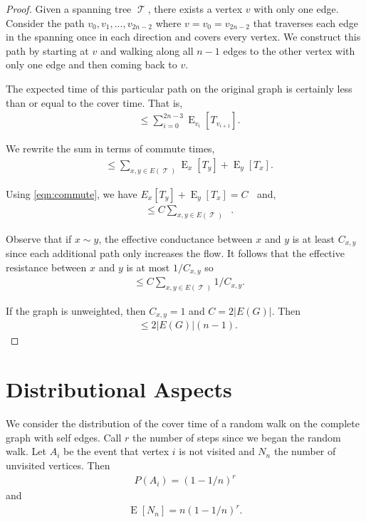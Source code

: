 \documentclass[12pt]{article}
\theoremstyle{definition}
\DeclareMathOperator{\E}{\mathrm{E}}		     %
\DeclareMathOperator{\tcov}{t_\textrm{cov}}      %
\DeclareMathOperator{\Rxy}{R_{\textrm{x,y}}}     %
\DeclareMathOperator{\T}{\mathcal{T}}            %
\begin{document}
\begin{proof}
Given a spanning tree $\T$, there exists a vertex $v$ with only one edge.
Consider the path $v_0, v_1, ..., v_{2n-2}$ where $v=v_0=v_{2n-2}$
that traverses each edge in the spanning once in each direction
and covers every vertex.
We construct this path by starting at $v$ and walking along all $n-1$ edges to the
other vertex with only one edge and then coming back to $v$.

The expected time of this particular path on the original graph is certainly less than
or equal to the cover time. That is,
\begin{align}
\tcov &\leq \sum_{i=0}^{2n-3} \E_{v_i}[T_{v_{i+1}}]. \nonumber
\end{align}

We rewrite the sum in terms of commute times,
\begin{align}
\tcov &\leq \sum_{x,y \in E(\T)} \E_x[T_y] + \E_y[T_x]. \nonumber
\end{align}

Using \cref{eqn:commute}, we have $E_x[T_y] + \E_y[T_x] = C \Rxy$ and,
\begin{align}
\tcov &\leq C \sum_{x,y \in E(\T)} \Rxy. \nonumber
\end{align}

Observe that if $x \sim y$,
the effective conductance between $x$ and $y$ is at least $C_{x,y}$
since each additional path only increases the flow.
It follows that the effective resistance between $x$ and $y$ is at most $1 / C_{x,y}$ so
\begin{align}
\tcov &\leq C \sum_{x,y \in E(\T)} 1 / C_{x,y}. \nonumber
\end{align}

If the graph is unweighted, then $C_{x,y} = 1$ and $C = 2 |E(G)|$.
Then
\begin{align}
\tcov \leq 2 |E(G)| (n-1). \nonumber
\end{align}

\end{proof}


\section{Distributional Aspects}
\cite{Du11}
We consider the distribution of the cover time of a random walk
on the complete graph with self edges.
Call $r$ the number of steps since we began the random walk.
Let $A_i$ be the event that vertex $i$ is not visited and
$N_n$ the number of unvisited vertices.
Then
\begin{align}
P(A_i) = (1-1/n)^r \nonumber
\end{align}
and
\begin{align}
\E[N_n] = n(1-1/n)^r. \nonumber
\end{align}
\end{document}
